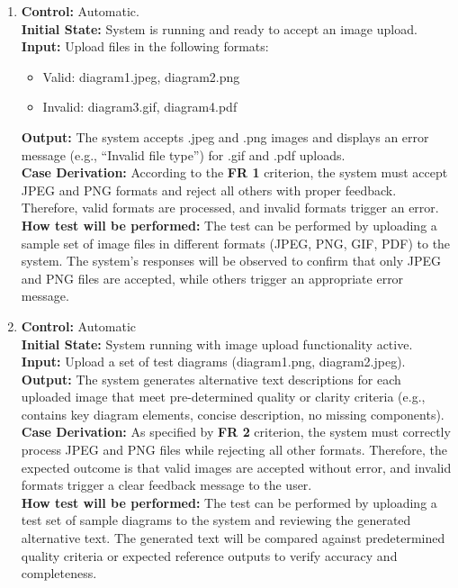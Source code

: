\documentclass[12pt, titlepage]{article}
\begin{document}
\begin{enumerate}[label=FR-ST \arabic*., wide=0pt, leftmargin=*]
  \item{}
    {\bf Control:} Automatic. \\
    {\bf Initial State:} System is running and ready to accept an
    image upload.\\
    {\bf Input:} Upload files in the following formats:
    \begin{itemize}
      \item Valid: diagram1.jpeg, diagram2.png
      \item Invalid: diagram3.gif, diagram4.pdf
    \end{itemize}
    {\bf Output:} The system accepts .jpeg and .png images and
    displays an error message (e.g., “Invalid file type”) for .gif
    and .pdf uploads.\\
    {\bf  Case Derivation:} According to the \textbf{FR 1} criterion, the system
    must accept JPEG and PNG formats and reject all others with proper
    feedback. Therefore, valid formats are processed, and invalid
    formats trigger an error.\\
    {\bf How test will be performed:} The test can be performed by
    uploading a sample set of image files in different formats (JPEG,
    PNG, GIF, PDF) to the system. The system’s responses will be
    observed to confirm that only JPEG and PNG files are accepted,
    while others trigger an appropriate error message.\\

  \item{}
    {\bf Control:} Automatic\\
    {\bf Initial State:} System running with image upload
    functionality active.\\
    {\bf Input:} Upload a set of test diagrams (diagram1.png, diagram2.jpeg).\\
    {\bf Output:} The system generates alternative text descriptions
    for each uploaded image that meet pre-determined quality or
    clarity criteria (e.g., contains key diagram elements, concise
    description, no missing components).\\
    {\bf  Case Derivation:} As specified by \textbf{FR 2} criterion,
    the system must correctly process JPEG and PNG files while
    rejecting all other formats. Therefore, the expected outcome is
    that valid images are accepted without error, and invalid formats
    trigger a clear feedback message to the user.\\
    {\bf How test will be performed:} The test can be performed by
    uploading a test set of sample diagrams to the system and
    reviewing the generated alternative text. The generated text will
    be compared against predetermined quality criteria or expected
    reference outputs to verify accuracy and completeness.\\


\end{enumerate}
\end{document}
